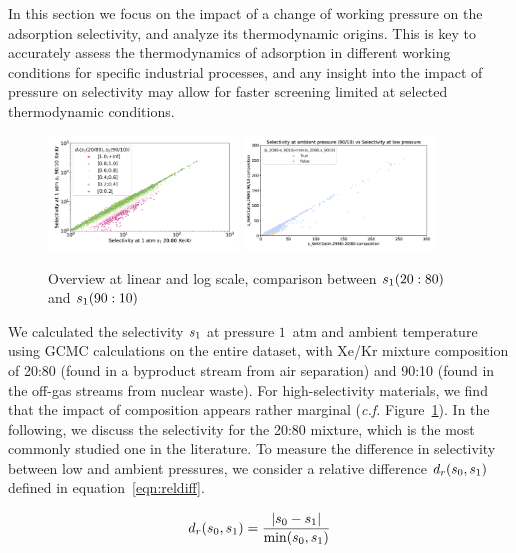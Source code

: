\documentclass[main.tex]{subfiles}
\begin{document}
  In this section we focus on the impact of a change of working pressure on the adsorption selectivity, and analyze its thermodynamic origins. This is key to accurately assess the thermodynamics of adsorption in different working conditions for specific industrial processes, and any insight into the impact of pressure on selectivity may allow for faster screening limited at selected thermodynamic conditions.
  
  \begin{figure}[h]
    \centering
      \includegraphics[width=0.45\textwidth]{figures/2-thermo/s_2080_vs_s_9010_overview_log.jpg}
      \includegraphics[width=0.45\textwidth]{figures/2-thermo/s_2080_vs_s_9010_overview.jpg}
      \caption{Overview at linear and log scale, comparison between $s_{\text{1}}(20:80)$ and $s_{\text{1}}(90:10)$}
      \label{fgr:SI:overview_2080_9010}
    \end{figure}

  We calculated the selectivity $s_{\text{1}}$ at pressure $1$~atm and ambient temperature using GCMC calculations on the entire dataset, with Xe/Kr mixture composition of 20:80 (found in a byproduct stream from air separation\cite{kerry2007industrial}) and 90:10 (found in the off-gas streams from nuclear waste\cite{auerbach2003handbook}). For high-selectivity materials, we find that the impact of composition appears rather marginal (\emph{c.f.} Figure~\ref{fgr:SI:overview_2080_9010}). In the following, we discuss the selectivity for the 20:80 mixture, which is the most commonly studied one in the literature. To measure the difference in selectivity between low and ambient pressures, we consider a relative difference $d_r(s_{\text{0}},s_{\text{1}})$ defined in equation~\ref{eqn:reldiff}.
  
  \begin{equation} \label{eqn:reldiff}
      d_r(s_{\text{0}},s_{\text{1}}) = \dfrac{\lvert s_{\text{0}} - s_{\text{1}} \rvert}{\min(s_{\text{0}},s_{\text{1}})}
  \end{equation}
  
\end{document}

